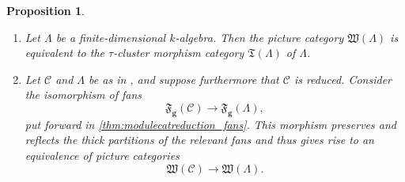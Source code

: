 \documentclass[10pt,twoside, a4paper,reqno]{amsart}
\newcommand{\partfan}[1]{\mathfrak{F}_{\bfg}(#1)}
\newcommand{\Wfrak}{\mathfrak{W}}
\newcommand{\calC}{\mathcal{C}}
\newcommand{\bfg}{\mathbf{g}}
\newtheorem{proposition}[theorem]{Proposition}
\theoremstyle{definition}
\begin{document}
\begin{proposition}\label{prop:samePartition}
    \label{thm:modulecatreduction_piccat}
    \, 
    
    \begin{enumerate}
    	\item \label{thm:modulecatreduction_piccat1}  Let $\Lambda$ be a finite-dimensional $k$-algebra. Then the picture category $\Wfrak(\Lambda)$ is equivalent to the $\tau$-cluster morphism category $\mathfrak{T}(\Lambda)$ of $\Lambda$.
	\item \label{thm:modulecatreduction_piccat2} Let $\calC$ and $\Lambda$ be as in , and suppose furthermore that $\calC$ is reduced. 
    Consider the isomorphism of fans
    \begin{equation*}
        \partfan{\calC} \to \partfan{\Lambda},
    \end{equation*}
    put forward in \eqref{thm:modulecatreduction_fans}. This morphism preserves and reflects the thick partitions of the relevant fans and thus gives rise to an equivalence of picture categories
     \[\Wfrak(\calC) \to \Wfrak(\Lambda).\]
    \end{enumerate}
\end{proposition}
\end{document}
